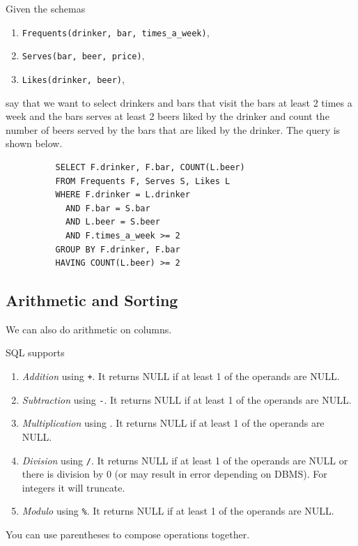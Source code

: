 \documentclass{article}
\begin{document}
      \begin{example}
        Given the schemas 
        \begin{enumerate}
          \item \texttt{Frequents(drinker, bar, times\_a\_week)}, 
          \item \texttt{Serves(bar, beer, price)}, 
          \item \texttt{Likes(drinker, beer)}, 
        \end{enumerate}
        say that we want to select drinkers and bars that visit the bars at least 2 times a week and the bars serves at least 2 beers liked by the drinker and count the number of beers served by the bars that are liked by the drinker. The query is shown below. 

        \begin{lstlisting}
          SELECT F.drinker, F.bar, COUNT(L.beer) 
          FROM Frequents F, Serves S, Likes L 
          WHERE F.drinker = L.drinker
            AND F.bar = S.bar 
            AND L.beer = S.beer 
            AND F.times_a_week >= 2 
          GROUP BY F.drinker, F.bar 
          HAVING COUNT(L.beer) >= 2 
        \end{lstlisting}
      \end{example}

  \subsection{Arithmetic and Sorting} 

    We can also do arithmetic on columns. 

    \begin{definition}
      SQL supports 
      \begin{enumerate}
        \item \textit{Addition} using \texttt{+}. It returns NULL if at least 1 of the operands are NULL. 
        \item \textit{Subtraction} using \texttt{-}. It returns NULL if at least 1 of the operands are NULL. 
        \item \textit{Multiplication} using \texttt{\*}. It returns NULL if at least 1 of the operands are NULL. 
        \item \textit{Division} using \texttt{/}. It returns NULL if at least 1 of the operands are NULL or there is division by $0$ (or may result in error depending on DBMS). For integers it will truncate. 
        \item \textit{Modulo} using \texttt{\%}. It returns NULL if at least 1 of the operands are NULL. 
      \end{enumerate}
      You can use parentheses to compose operations together. 
    \end{definition}
\end{document}

